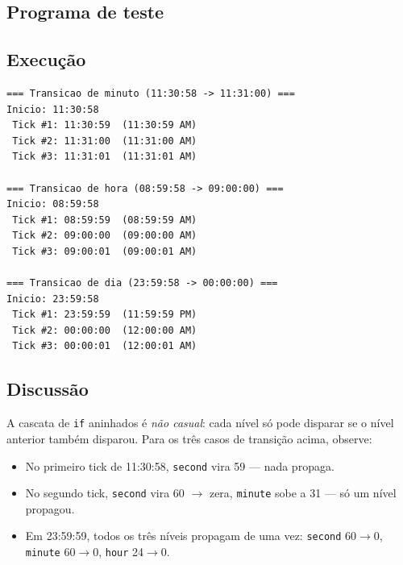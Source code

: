 \documentclass[11pt,a4paper]{article}
\begin{document}


\subsection*{Programa de teste}



\subsection*{Execu\c{c}\~ao}

\begin{saidabox}
\begin{lstlisting}[style=terminal]
=== Transicao de minuto (11:30:58 -> 11:31:00) ===
Inicio: 11:30:58
 Tick #1: 11:30:59  (11:30:59 AM)
 Tick #2: 11:31:00  (11:31:00 AM)
 Tick #3: 11:31:01  (11:31:01 AM)

=== Transicao de hora (08:59:58 -> 09:00:00) ===
Inicio: 08:59:58
 Tick #1: 08:59:59  (08:59:59 AM)
 Tick #2: 09:00:00  (09:00:00 AM)
 Tick #3: 09:00:01  (09:00:01 AM)

=== Transicao de dia (23:59:58 -> 00:00:00) ===
Inicio: 23:59:58
 Tick #1: 23:59:59  (11:59:59 PM)
 Tick #2: 00:00:00  (12:00:00 AM)
 Tick #3: 00:00:01  (12:00:01 AM)
\end{lstlisting}
\end{saidabox}

\subsection*{Discuss\~ao}

A cascata de \texttt{if} aninhados \'e \emph{n\~ao casual}: cada n\'ivel s\'o pode disparar se o n\'ivel anterior tamb\'em disparou. Para os tr\^es casos de transi\c{c}\~ao acima, observe:

\begin{itemize}[leftmargin=*]
  \item No primeiro tick de 11:30:58, \texttt{second} vira 59 --- nada propaga.
  \item No segundo tick, \texttt{second} vira 60 $\to$ zera, \texttt{minute} sobe a 31 --- s\'o um n\'ivel propagou.
  \item Em 23:59:59, todos os tr\^es n\'iveis propagam de uma vez: \texttt{second} 60$\to$0, \texttt{minute} 60$\to$0, \texttt{hour} 24$\to$0.
\end{itemize}
\end{document}
